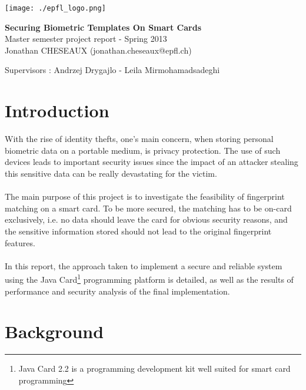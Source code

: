 \documentclass[a4paper,12pt]{article}
\author{Jonathan Cheseaux}
\begin{document}
\pagestyle{fancy}
\begin{center}
{\texttt{[image: ./epfl\_logo.png]}}\\
\end{center}

\vspace{3cm}

\begin{center}
\thispagestyle{empty}
{\huge\bf Securing Biometric Templates On Smart Cards }\\

\vspace{2cm}
\LARGE Master semester project report - Spring 2013\\
\normalsize Jonathan CHESEAUX (jonathan.cheseaux@epfl.ch)

\vspace{10cm}
Supervisors : Andrzej Drygajlo - Leila Mirmohamadsadeghi \\
\end{center}

\clearpage\mbox{}\clearpage
\thispagestyle{empty}
\newpage
\tableofcontents
\thispagestyle{empty}
\newpage
\section{Introduction}
With the rise of identity thefts, one's main concern, when storing personal biometric data on a portable medium, is privacy protection. The use of such devices leads to important security issues since the impact of an attacker stealing this sensitive data can be really devastating for the victim.
\\\\
The main purpose of this project is to investigate the feasibility of fingerprint matching on a smart card. To be more secured, the matching has to be on-card exclusively, i.e. no data should leave the card for obvious security reasons, and the sensitive information stored should not lead to the original fingerprint features.
\\\\
In this report, the approach taken to implement a secure and reliable system using the Java Card\footnote{Java Card 2.2 is a programming development kit well suited for smart card programming} programming platform is detailed, as well as the results of performance and security analysis of the final implementation.

\newpage
\section{Background}
\end{document}
